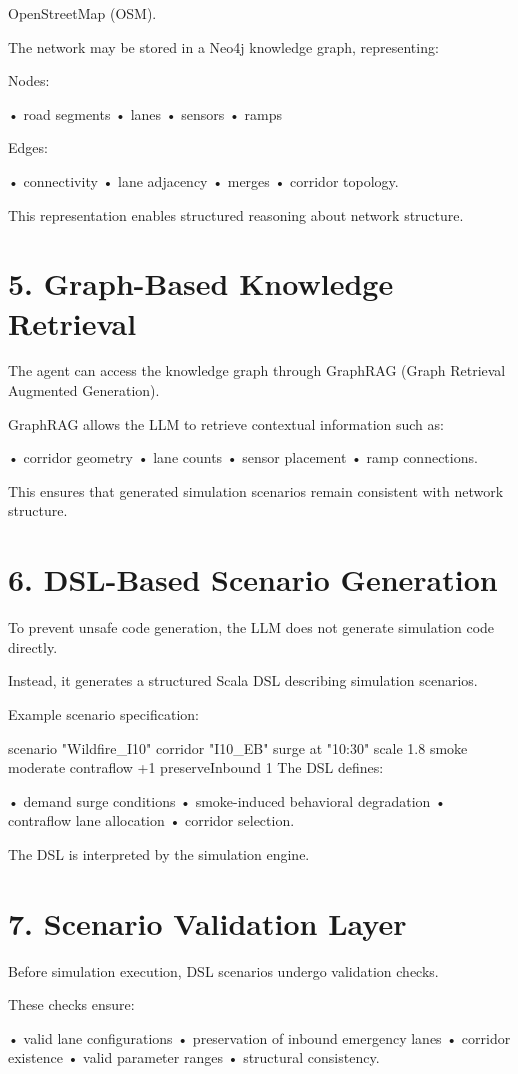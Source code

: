 OpenStreetMap (OSM).

The network may be stored in a Neo4j knowledge graph, representing:

Nodes:

• road segments
• lanes
• sensors
• ramps

Edges:

• connectivity
• lane adjacency
• merges
• corridor topology.

This representation enables structured reasoning about network structure.

\chapter*{5. Graph-Based Knowledge Retrieval}
The agent can access the knowledge graph through GraphRAG (Graph Retrieval Augmented Generation).

GraphRAG allows the LLM to retrieve contextual information such as:

• corridor geometry
• lane counts
• sensor placement
• ramp connections.

This ensures that generated simulation scenarios remain consistent with network structure.

\chapter*{6. DSL-Based Scenario Generation}
To prevent unsafe code generation, the LLM does not generate simulation code directly.

Instead, it generates a structured Scala DSL describing simulation scenarios.

Example scenario specification:

scenario "Wildfire_I10" {
  corridor "I10_EB"
  surge at "10:30" scale 1.8
  smoke moderate
  contraflow +1 preserveInbound 1
}
The DSL defines:

• demand surge conditions
• smoke-induced behavioral degradation
• contraflow lane allocation
• corridor selection.

The DSL is interpreted by the simulation engine.

\chapter*{7. Scenario Validation Layer}
Before simulation execution, DSL scenarios undergo validation checks.

These checks ensure:

• valid lane configurations
• preservation of inbound emergency lanes
• corridor existence
• valid parameter ranges
• structural consistency.

